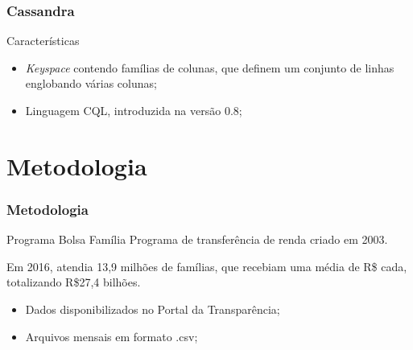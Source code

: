 \documentclass[brazil]{beamer}
\begin{document}
\begin{frame}
	\frametitle{Cassandra}
	\begin{block}{Características}
		\begin{itemize}
			\item \emph{Keyspace} contendo famílias de colunas, que definem um conjunto de linhas englobando várias colunas;
			\item Linguagem CQL, introduzida na versão 0.8;
		\end{itemize}
	\end{block}
\end{frame}
\section{Metodologia}
\begin{frame}
	\frametitle{Metodologia}
	\begin{block}{Programa Bolsa Família}
		Programa de transferência de renda criado em 2003. 
		
		Em 2016, atendia 13,9 milhões de famílias, que recebiam uma média de R\$ cada, totalizando R\$27,4 bilhões.
		
		\begin{itemize}
			\item Dados disponibilizados no Portal da Transparência;
			\item Arquivos mensais em formato .csv;
		\end{itemize}
	\end{block}
\end{frame}
\end{document}
